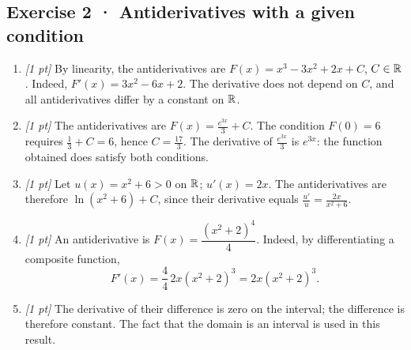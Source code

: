 \subsection*{Exercise 2 · Antiderivatives with a given condition}\begin{enumerate}

\item \textit{[1 pt]} By linearity, the antiderivatives are $F(x)=x^3-3x^2+2x+C$, $C\in\mathbb R$. Indeed, $F'(x)=3x^2-6x+2$. The derivative does not depend on $C$, and all antiderivatives differ by a constant on $\mathbb R$.

\item \textit{[1 pt]} The antiderivatives are $F(x)=\frac{e^{3x}}{3}+C$. The condition $F(0)=6$ requires $\frac{1}{3}+C=6$, hence $C=\frac{17}{3}$. The derivative of $\frac{e^{3x}}{3}$ is $e^{3x}$: the function obtained does satisfy both conditions.

\item \textit{[1 pt]} Let $u(x)=x^2+6>0$ on $\mathbb R$; $u'(x)=2x$. The antiderivatives are therefore $\ln(x^2+6)+C$, since their derivative equals $\frac{u'}{u}=\frac{2x}{x^2+6}$.

\item \textit{[1 pt]} An antiderivative is $F(x)=\dfrac{(x^2+2)^{4}}{4}$. Indeed, by differentiating a composite function,
\[F'(x)=\frac{4}{4}\,2x(x^2+2)^{3}=2x(x^2+2)^{3}.\]

\item \textit{[1 pt]} The derivative of their difference is zero on the interval; the difference is therefore constant. The fact that the domain is an interval is used in this result.

\end{enumerate}


